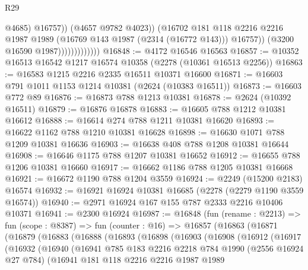 \begin{lexlean}{R29}
\begin{coremodule}
                                      @4685)
                                    @16757))
                                (@4657 @9782 @4023))
                              (@16702
                                @181
                                @118
                                @2216
                                @2216
                                @1987
                                @1989
                                (@16769 @143 @1987 (@2314 (@16772 @143)))
                                @16757))
                            (@3200 @16590 @1987)))))))))))))
@16848 := @4172 @16546 @16563
@16857 := @10352 @16513 @16542 @1217 @16574 @10358 (@2278 (@10361 @16513 @2256))
@16863 := @16583 @1215 @2216 @2335 @16511 @10371 @16600
@16871 := @16603 @791 @1011 @1153 @1214 @10381 (@2624 (@10383 @16511))
@16873 := @16603 @772 @89
@16876 := @16873 @788 @1213 @10381
@16878 := @2624 (@10392 @16511)
@16879 := @16876 @16878
@16883 := @16605 @788 @1212 @10381 @16612
@16888 := @16614 @274 @788 @1211 @10381 @16620
@16893 := @16622 @1162 @788 @1210 @10381 @16628
@16898 := @16630 @1071 @788 @1209 @10381 @16636
@16903 := @16638 @408 @788 @1208 @10381 @16644
@16908 := @16646 @1175 @788 @1207 @10381 @16652
@16912 := @16655 @788 @1206 @10381 @16660
@16917 := @16662 @1186 @788 @1205 @10381 @16668
@16921 := @16672 @1190 @788 @1204 @3559
@16924 := @2249 (@15200 @2183) @16574
@16932 := @16921 @16924 @10381 @16685 (@2278 (@2279 @1190 @3559 @16574))
@16940 := @2971 @16924 @167 @155 @787 @2333 @2216 @10406 @10371
@16941 := @2300 @16924
@16987 := @16848
    (fun (rename : @2213) =>
    fun (scope : @8387) =>
    fun (counter : @16) =>
    @16857
      (@16863
        (@16871
          (@16879
            (@16883
              (@16888
                (@16893
                  (@16898
                    (@16903
                      (@16908
                        (@16912
                          (@16917
                            (@16932
                              (@16940
                                (@16941
                                  @785
                                  @183
                                  @2216
                                  @2218
                                  @784
                                  @1990
                                  (@2556 @16924 @27 @784)
                                  (@16941
                                    @181
                                    @118
                                    @2216
                                    @2216
                                    @1987
                                    @1989

\end{coremodule}
\end{lexlean}
